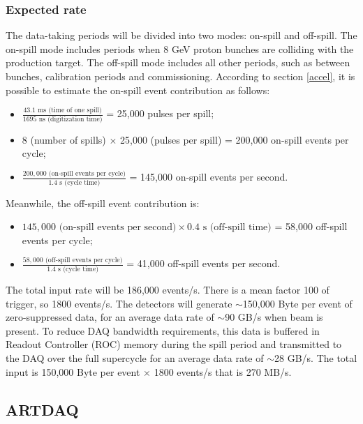 \subsubsection{Expected rate}
The data-taking periods will be divided into two modes: on-spill and off-spill. The on-spill mode includes periods when 8 GeV 
proton bunches are colliding with the production target. The off-spill mode includes all other periods, such as between bunches, calibration periods and commissioning.
According to section \ref{accel}, it is possible to estimate the on-spill event contribution as follows:
\begin{itemize}
    \item $\frac{43.1 \text{ ms (time of one spill)}}{1695 \text{ ns (digitization time)}}$ = 25,000 pulses per spill;
    \item 8 (number of spills) $\times$ 25,000 (pulses per spill) = 200,000 on-spill events per cycle;
    \item $\frac{200,000 \text{ (on-spill events per cycle)}}{1.4 \text{ s (cycle time)}}$ = 145,000 on-spill events per second.
\end{itemize}
Meanwhile, the off-spill event contribution is:
\begin{itemize}
    \item $145,000 \text{ (on-spill events per second)} \times 0.4 \text{ s (off-spill time)}$ = 58,000 off-spill events per cycle;
    \item $\frac{58,000 \text{ (off-spill events per cycle)}}{1.4 \text{ s (cycle time)}}$ = 41,000 off-spill events per second.
\end{itemize}
The total input rate will be 186,000 events/s. %
There is a mean factor 100 of trigger, so 1800 events/s.
The detectors will generate $\sim$150,000 Byte per event of zero-suppressed data, for an average data rate of $\sim$90 GB/s when beam is present. 
To reduce DAQ bandwidth requirements, this data is buffered in Readout Controller (ROC) memory during the spill period and transmitted to the 
DAQ over the full supercycle for an average data rate of $\sim$28 GB/s.
The total input is 150,000 Byte per event $\times$ 1800 events/s that is 270 MB/s.
\subsection{ARTDAQ}



